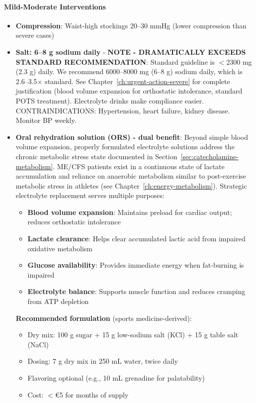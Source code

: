 \paragraph{Mild-Moderate Interventions}
\begin{itemize}
    \item \textbf{Compression}: Waist-high stockings 20--30 mmHg (lower compression than severe cases)

    \item \textbf{Salt: 6--8 g sodium daily} - \textbf{NOTE - DRAMATICALLY EXCEEDS STANDARD RECOMMENDATION}: Standard guideline is $<$2300 mg (2.3 g) daily. We recommend 6000--8000 mg (6--8 g) sodium daily, which is 2.6--3.5$\times$ standard. See Chapter~\ref{ch:urgent-action-severe} for complete justification (blood volume expansion for orthostatic intolerance, standard POTS treatment). Electrolyte drinks make compliance easier. CONTRAINDICATIONS: Hypertension, heart failure, kidney disease. Monitor BP weekly.

    \item \textbf{Oral rehydration solution (ORS) - dual benefit}: Beyond simple blood volume expansion, properly formulated electrolyte solutions address the chronic metabolic stress state documented in Section~\ref{sec:catecholamine-metabolism}. ME/CFS patients exist in a continuous state of lactate accumulation and reliance on anaerobic metabolism similar to post-exercise metabolic stress in athletes (see Chapter~\ref{ch:energy-metabolism}). Strategic electrolyte replacement serves multiple purposes:
    \begin{itemize}
        \item \textbf{Blood volume expansion}: Maintains preload for cardiac output; reduces orthostatic intolerance
        \item \textbf{Lactate clearance}: Helps clear accumulated lactic acid from impaired oxidative metabolism
        \item \textbf{Glucose availability}: Provides immediate energy when fat-burning is impaired
        \item \textbf{Electrolyte balance}: Supports muscle function and reduces cramping from ATP depletion
    \end{itemize}

    \textbf{Recommended formulation} (sports medicine-derived):
    \begin{itemize}
        \item Dry mix: 100 g sugar + 15 g low-sodium salt (KCl) + 15 g table salt (NaCl)
        \item Dosing: 7 g dry mix in 250 mL water, twice daily
        \item Flavoring optional (e.g., 10 mL grenadine for palatability)
        \item Cost: $<$\euro{}5 for months of supply
    \end{itemize}


\end{itemize}
